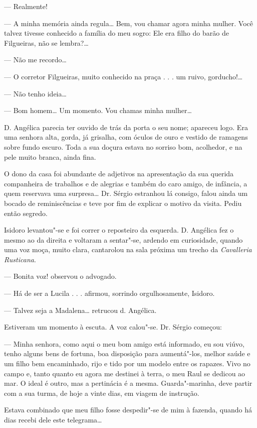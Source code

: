 --- Realmente!

--- A minha memória ainda regula\ldots{} Bem, vou chamar agora minha mulher.
Você talvez tivesse conhecido a família do meu sogro: Ele era filho do
barão de Filgueiras, não se lembra?\ldots{}

--- Não me recordo\ldots{}

--- O corretor Filgueiras, muito conhecido na praça . . . um ruivo,
gorducho!\ldots{}

--- Não tenho ideia\ldots{}

--- Bom homem\ldots{} Um momento. Vou chamas minha mulher\ldots{}

D. Angélica parecia ter ouvido de trás da porta o seu nome; apareceu
logo. Era uma senhora alta, gorda, já grisalha, com óculos de ouro e
vestido de ramagens sobre fundo escuro. Toda a sua doçura estava no
sorriso bom, acolhedor, e na pele muito branca, ainda fina.

O dono da casa foi abundante de adjetivos na apresentação da sua querida
companheira de trabalhos e de alegrias e também do caro amigo, de
infância, a quem reservava uma surpresa\ldots{} Dr. Sérgio estranhou lá
consigo, falou ainda um bocado de reminiscências e teve por fim de
explicar o motivo da visita. Pediu então segredo.

Isidoro levantou"-se e foi correr o reposteiro da esquerda. D. Angélica
fez o mesmo ao da direita e voltaram a sentar"-se, ardendo em
curiosidade, quando uma voz moça, muito clara, cantarolou na sala
próxima um trecho da \emph{Cavalleria Rusticana}.

--- Bonita voz! observou o advogado.

--- Há de ser a Lucila . . . afirmou, sorrindo orgulhosamente, Isidoro.

--- Talvez seja a Madalena\ldots{} retrucou d. Angélica.

Estiveram um momento à escuta. A voz calou"-se. Dr. Sérgio começou:

--- Minha senhora, como aqui o meu bom amigo está informado, eu sou
viúvo, tenho alguns bens de fortuna, boa disposição para aumentá"-los,
melhor saúde e um filho bem encaminhado, rijo e tido por um modelo entre
os rapazes. Vivo no campo e, tanto quanto eu agora me destinei à terra,
o meu Raul se dedicou ao mar. O ideal é outro, mas a pertinácia é a
mesma. Guarda"-marinha, deve partir com a sua turma, de hoje a vinte
dias, em viagem de instrução.

Estava combinado que meu filho fosse despedir"-se de mim à fazenda,
quando há dias recebi dele este telegrama\ldots{}


